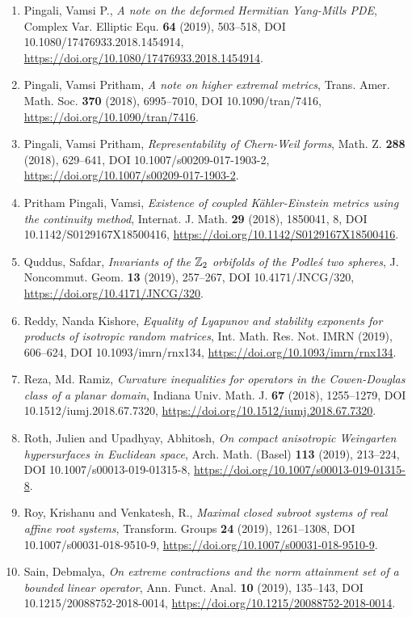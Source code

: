 \begin{enumerate}
\item Pingali, Vamsi P., {\em A note on the deformed {H}ermitian {Y}ang-{M}ills {PDE}}, Complex Var. Elliptic Equ. {\bf 64} (2019), 503--518, DOI 10.1080/17476933.2018.1454914, \url{https://doi.org/10.1080/17476933.2018.1454914}.
\item Pingali, Vamsi Pritham, {\em A note on higher extremal metrics}, Trans. Amer. Math. Soc. {\bf 370} (2018), 6995--7010, DOI 10.1090/tran/7416, \url{https://doi.org/10.1090/tran/7416}.
\item Pingali, Vamsi Pritham, {\em Representability of {C}hern-{W}eil forms}, Math. Z. {\bf 288} (2018), 629--641, DOI 10.1007/s00209-017-1903-2, \url{https://doi.org/10.1007/s00209-017-1903-2}.
\item Pritham Pingali, Vamsi, {\em Existence of coupled {K}\"{a}hler-{E}instein metrics using the
continuity method}, Internat. J. Math. {\bf 29} (2018), 1850041, 8, DOI 10.1142/S0129167X18500416, \url{https://doi.org/10.1142/S0129167X18500416}.
\item Quddus, Safdar, {\em Invariants of the {$\Bbb Z_2$} orbifolds of the {P}odle\'{s} two
spheres}, J. Noncommut. Geom. {\bf 13} (2019), 257--267, DOI 10.4171/JNCG/320, \url{https://doi.org/10.4171/JNCG/320}.
\item Reddy, Nanda Kishore, {\em Equality of {L}yapunov and stability exponents for products of
isotropic random matrices}, Int. Math. Res. Not. IMRN {\bf } (2019), 606--624, DOI 10.1093/imrn/rnx134, \url{https://doi.org/10.1093/imrn/rnx134}.
\item Reza, Md. Ramiz, {\em Curvature inequalities for operators in the {C}owen-{D}ouglas
class of a planar domain}, Indiana Univ. Math. J. {\bf 67} (2018), 1255--1279, DOI 10.1512/iumj.2018.67.7320, \url{https://doi.org/10.1512/iumj.2018.67.7320}.
\item Roth, Julien and Upadhyay, Abhitosh, {\em On compact anisotropic {W}eingarten hypersurfaces in
{E}uclidean space}, Arch. Math. (Basel) {\bf 113} (2019), 213--224, DOI 10.1007/s00013-019-01315-8, \url{https://doi.org/10.1007/s00013-019-01315-8}.
\item Roy, Krishanu and Venkatesh, R., {\em Maximal closed subroot systems of real affine root systems}, Transform. Groups {\bf 24} (2019), 1261--1308, DOI 10.1007/s00031-018-9510-9, \url{https://doi.org/10.1007/s00031-018-9510-9}.
\item Sain, Debmalya, {\em On extreme contractions and the norm attainment set of a
bounded linear operator}, Ann. Funct. Anal. {\bf 10} (2019), 135--143, DOI 10.1215/20088752-2018-0014, \url{https://doi.org/10.1215/20088752-2018-0014}.

\end{enumerate}
